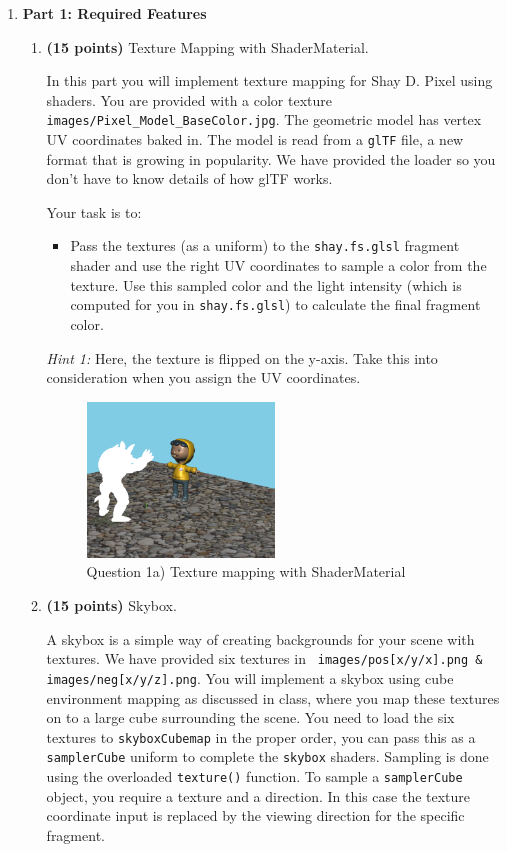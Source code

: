 \documentclass[12pt]{exam}
\begin{document}
\begin{enumerate}

\item {\bf Part 1: Required Features}

  \begin{enumerate}

\item {\bf (15 points)} Texture Mapping with ShaderMaterial.

In this part you will implement texture mapping for Shay D. Pixel using shaders. You are provided with a color texture \texttt{images/Pixel\_Model\_BaseColor.jpg}. The geometric model has vertex UV coordinates baked in. The model is read from a \texttt{glTF} file, a new format that is growing in popularity. We have provided the loader so you don't have to know details of how glTF works.
  
Your task is to:
\begin{itemize}
    \item Pass the textures (as a uniform) to the \texttt{shay.fs.glsl} fragment shader and use the right UV coordinates to sample a color from the texture. Use this sampled color and the light intensity (which is computed for you in \texttt{shay.fs.glsl}) to calculate the final fragment color.
\end{itemize}

\textit{Hint 1:} Here, the texture is flipped on the y-axis. Take this into consideration when you assign the UV coordinates.
\begin{figure}[H]
  \centering
  \includegraphics[width=0.5\textwidth]{./part-aii.png}
  \caption{Question 1a) Texture mapping with ShaderMaterial\label{fig:part-aii}}
\end{figure}

    
\item {\bf (15 points)} Skybox.

A skybox is a simple way of creating backgrounds for your scene with textures. We have provided six textures in \texttt{ images/pos[x/y/x].png \& images/neg[x/y/z].png}. You will implement a skybox using cube environment mapping as discussed in class, where you map these textures on to a large cube surrounding the scene. You need to load the six textures to \texttt{skyboxCubemap} in the proper order, you can pass this as a \texttt{samplerCube} uniform to complete the \texttt{skybox} shaders. Sampling is done using the overloaded \texttt{texture()} function. To sample a \texttt{samplerCube} object, you require a texture and a direction. 
 In this case the texture coordinate input is replaced by the viewing direction for the specific fragment.


\end{enumerate}
\end{enumerate}
\end{document}
